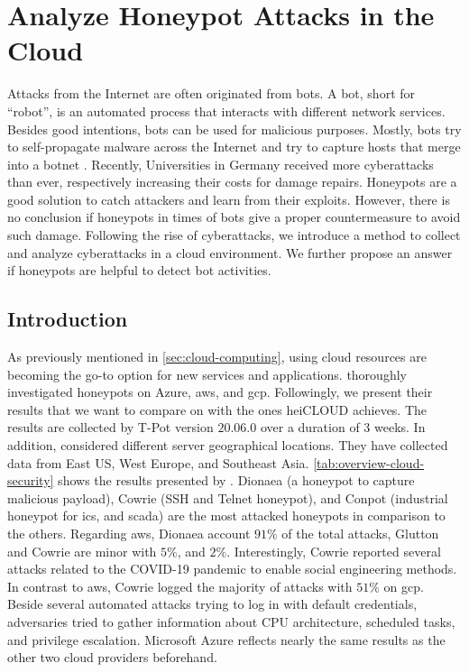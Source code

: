 \chapter{Analyze Honeypot Attacks in the Cloud}
\label{chap:cloud-security}

Attacks from the Internet are often originated from bots.
A bot, short for \enquote{robot}, is an automated process that interacts with different network services.
Besides good intentions, bots can be used for malicious purposes.
Mostly, bots try to self-propagate malware across the Internet and try to capture hosts that merge into a botnet \cite{Feily2009}.
Recently, Universities in Germany received more cyberattacks than ever, respectively increasing their costs for damage repairs.
Honeypots are a good solution to catch attackers and learn from their exploits.
However, there is no conclusion if honeypots in times of bots give a proper countermeasure to avoid such damage.
Following the rise of cyberattacks, we introduce a method to collect and analyze cyberattacks in a cloud environment.
We further propose an answer if honeypots are helpful to detect bot activities.

\section{Introduction}

As previously mentioned in \autoref{sec:cloud-computing}, using cloud resources are becoming the go-to option for new services and applications.
\citet{Kelly2021} thoroughly investigated honeypots on Azure, \ac{aws}, and \ac{gcp}.
Followingly, we present their results that we want to compare on with the ones heiCLOUD achieves.
The results are collected by T-Pot version $20.06.0$ over a duration of 3 weeks.
In addition, \citet{Kelly2021} considered different server geographical locations.
They have collected data from East US, West Europe, and Southeast Asia.
\autoref{tab:overview-cloud-security} shows the results presented by \citet{Kelly2021}.
Dionaea (a honeypot to capture malicious payload), Cowrie (SSH and Telnet honeypot), and Conpot (industrial honeypot for \acs{ics}, and \acs{scada}) are the most attacked honeypots in comparison to the others.
Regarding \ac{aws}, Dionaea account $91\%$ of the total attacks, Glutton and Cowrie are minor with $5\%$, and $2\%$.
Interestingly, Cowrie reported several attacks related to the COVID-19 pandemic to enable social engineering methods.
In contrast to \ac{aws}, Cowrie logged the majority of attacks with $51\%$ on \ac{gcp}.
Beside several automated attacks trying to log in with default credentials, adversaries tried to gather information about CPU architecture, scheduled tasks, and privilege escalation.
Microsoft Azure reflects nearly the same results as the other two cloud providers beforehand.

